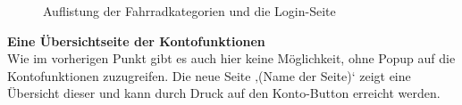 \begin{figure}[H]
\begin{center}
\caption{Auflistung der Fahrradkategorien und die Login-Seite}
\end{center}
\end{figure}

\textbf{Eine Übersichtseite der Kontofunktionen}
\\
Wie im vorherigen Punkt gibt es auch hier keine Möglichkeit, ohne Popup auf die Kontofunktionen zuzugreifen. Die neue Seite ‚(Name der Seite)‘ zeigt eine Übersicht dieser und kann durch Druck auf den Konto-Button erreicht werden.

